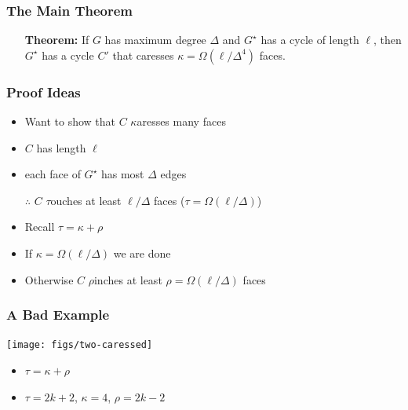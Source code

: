\documentclass[xcolor=dvipsnames]{beamer}
\newcommand{\dual}[1]{#1^\star}
\begin{document}
\begin{frame}
  \frametitle{The Main Theorem}

  \begin{itemize}
     \item[]\textbf{Theorem:} If $G$ has maximum degree $\Delta$ and $\dual{G}$ has a cycle of length $\ell$, then $\dual{G}$ has a cycle $C'$ that caresses $\kappa=\Omega(\ell/\Delta^4)$ faces.
  \end{itemize}
\end{frame}

\begin{frame}
  \frametitle{Proof Ideas}

  
  \begin{itemize}
     \item Want to show that $C$ $\kappa$aresses many faces
     \item $C$ has length $\ell$
     \item each face of $\dual{G}$ has most $\Delta$ edges
     \item[$\therefore$] $C$ $\tau$ouches at least $\ell/\Delta$ faces
          ($\tau = \Omega(\ell/\Delta)$)
     \item Recall $\tau = \kappa + \rho$
     \item If $\kappa =\Omega(\ell/\Delta)$ we are done
     \item Otherwise $C$ $\rho$inches at least $\rho = \Omega(\ell/\Delta)$ faces
  \end{itemize}
\end{frame}


\begin{frame}
  \frametitle{A Bad Example}

  \begin{center}
     \texttt{[image: figs/two-caressed]}
  \end{center}
  \begin{itemize}
    \item $\tau = \kappa + \rho$
    \item $\tau = 2k+2$, $\kappa = 4$, $\rho = 2k-2$
  \end{itemize}
\end{frame}
\end{document}
